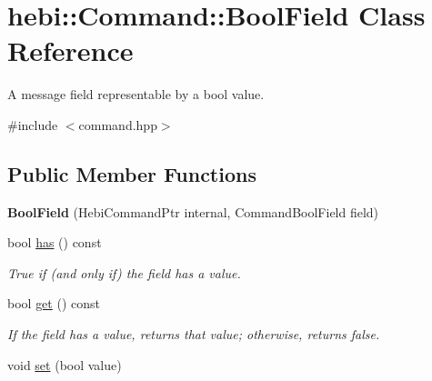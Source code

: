 \hypertarget{classhebi_1_1Command_1_1BoolField}{}\section{hebi\+:\+:Command\+:\+:Bool\+Field Class Reference}
\label{classhebi_1_1Command_1_1BoolField}


A message field representable by a bool value.  




{\ttfamily \#include $<$command.\+hpp$>$}

\subsection*{Public Member Functions}
\begin{DoxyCompactItemize}
\item 
{\bfseries Bool\+Field} (Hebi\+Command\+Ptr internal, Command\+Bool\+Field field)\hypertarget{classhebi_1_1Command_1_1BoolField_aa7c37e884beea83cbfeddad70722a5af}{}\label{classhebi_1_1Command_1_1BoolField_aa7c37e884beea83cbfeddad70722a5af}

\item 
bool \hyperlink{classhebi_1_1Command_1_1BoolField_afd698bc81b70deab9bfec0887e0e56d3}{has} () const \hypertarget{classhebi_1_1Command_1_1BoolField_afd698bc81b70deab9bfec0887e0e56d3}{}\label{classhebi_1_1Command_1_1BoolField_afd698bc81b70deab9bfec0887e0e56d3}

\begin{DoxyCompactList}\small\item\em True if (and only if) the field has a value. \end{DoxyCompactList}\item 
bool \hyperlink{classhebi_1_1Command_1_1BoolField_addffa9a7693928c35c959d36527c621b}{get} () const \hypertarget{classhebi_1_1Command_1_1BoolField_addffa9a7693928c35c959d36527c621b}{}\label{classhebi_1_1Command_1_1BoolField_addffa9a7693928c35c959d36527c621b}

\begin{DoxyCompactList}\small\item\em If the field has a value, returns that value; otherwise, returns false. \end{DoxyCompactList}\item 
void \hyperlink{classhebi_1_1Command_1_1BoolField_af5c94cf5ce17aaf9b159df3a2c83f2f6}{set} (bool value)\hypertarget{classhebi_1_1Command_1_1BoolField_af5c94cf5ce17aaf9b159df3a2c83f2f6}{}\label{classhebi_1_1Command_1_1BoolField_af5c94cf5ce17aaf9b159df3a2c83f2f6}


\end{DoxyCompactItemize}
